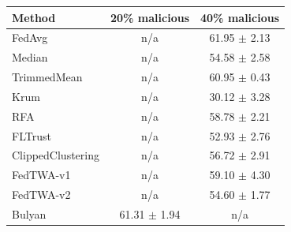 \begin{tabular}{lcc}
\toprule
Method & 20\% malicious & 40\% malicious \\
\midrule
FedAvg & n/a & 61.95 $\pm$ 2.13 \\
Median & n/a & 54.58 $\pm$ 2.58 \\
TrimmedMean & n/a & 60.95 $\pm$ 0.43 \\
Krum & n/a & 30.12 $\pm$ 3.28 \\
RFA & n/a & 58.78 $\pm$ 2.21 \\
FLTrust & n/a & 52.93 $\pm$ 2.76 \\
ClippedClustering & n/a & 56.72 $\pm$ 2.91 \\
FedTWA-v1 & n/a & 59.10 $\pm$ 4.30 \\
FedTWA-v2 & n/a & 54.60 $\pm$ 1.77 \\
Bulyan & 61.31 $\pm$ 1.94 & n/a \\
\bottomrule
\end{tabular}